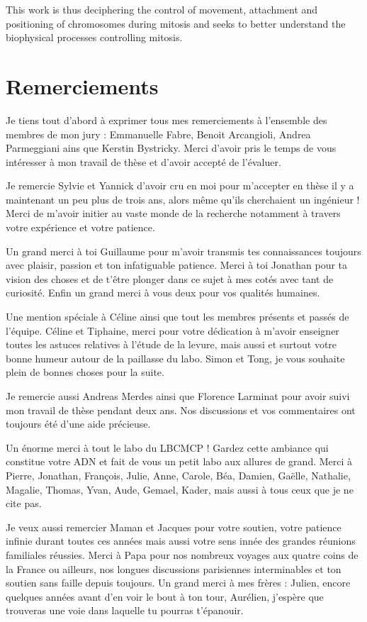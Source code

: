 \documentclass[12pt,a4paper,twoside,openright]{book}
\begin{document}
This work is thus deciphering the control of movement, attachment and
positioning of chromosomes during mitosis and seeks to better understand
the biophysical processes controlling mitosis.

\cleardoublepage

\section*{Remerciements}

Je tiens tout d'abord à exprimer tous mes remerciements à l'ensemble des
membres de mon jury : Emmanuelle Fabre, Benoit Arcangioli, Andrea
Parmeggiani ains que Kerstin Bystricky. Merci d'avoir pris le temps de
vous intéresser à mon travail de thèse et d'avoir accepté de l'évaluer.

Je remercie Sylvie et Yannick d'avoir cru en moi pour m'accepter en
thèse il y a maintenant un peu plus de trois ans, alors même qu'ils
cherchaient un ingénieur ! Merci de m'avoir initier au vaste monde de la
recherche notamment à travers votre expérience et votre patience.

Un grand merci à toi Guillaume pour m'avoir transmis tes connaissances
toujours avec plaisir, passion et ton infatiguable patience. Merci à toi
Jonathan pour ta vision des choses et de t'être plonger dans ce sujet à
mes cotés avec tant de curiosité. Enfin un grand merci à vous deux pour
vos qualités humaines.

Une mention spéciale à Céline ainsi que tout les membres présents et
passés de l'équipe. Céline et Tiphaine, merci pour votre dédication à
m'avoir enseigner toutes les astuces relatives à l'étude de la levure,
mais aussi et surtout votre bonne humeur autour de la paillasse du labo.
Simon et Tong, je vous souhaite plein de bonnes choses pour la suite.

Je remercie aussi Andreas Merdes ainsi que Florence Larminat pour avoir
suivi mon travail de thèse pendant deux ans. Nos discussions et vos
commentaires ont toujours été d'une aide précieuse.

Un énorme merci à tout le labo du LBCMCP ! Gardez cette ambiance qui
constitue votre ADN et fait de vous un petit labo aux allures de grand.
Merci à Pierre, Jonathan, François, Julie, Anne, Carole, Béa, Damien,
Gaëlle, Nathalie, Magalie, Thomas, Yvan, Aude, Gemael, Kader, mais aussi
à tous ceux que je ne cite pas.

Je veux aussi remercier Maman et Jacques pour votre soutien, votre
patience infinie durant toutes ces années mais aussi votre sens innée
des grandes réunions familiales réussies. Merci à Papa pour nos nombreux
voyages aux quatre coins de la France ou ailleurs, nos longues
discussions parisiennes interminables et ton soutien sans faille depuis
toujours. Un grand merci à mes frères : Julien, encore quelques années
avant d'en voir le bout à ton tour, Aurélien, j'espère que trouveras une
voie dans laquelle tu pourras t'épanouir.
\end{document}
